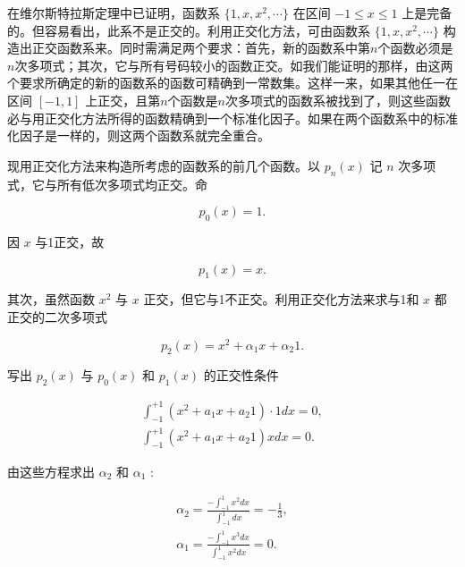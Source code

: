 在维尔斯特拉斯定理中已证明，函数系 $\{1,x,x^{2},\cdots\}$ 在区间 $-1\leqslant x\leqslant1$ 上是完备的。但容易看出，此系不是正交的。利用正交化方法，可由函数系 $\{1,x,x^{2},\cdots\}$ 构造出正交函数系来。同时需满足两个要求：首先，新的函数系中第$n$个函数必须是$n$次多项式；其次，它与所有号码较小的函数正交。如我们能证明的那样，由这两个要求所确定的新的函数系的函数可精确到一常数集。这样一来，如果其他任一在区间 $[-1,1]$ 上正交，且第$n$个函数是$n$次多项式的函数系被找到了，则这些函数必与用正交化方法所得的函数精确到一个标准化因子。如果在两个函数系中的标准化因子是一样的，则这两个函数系就完全重合。

现用正交化方法来构造所考虑的函数系的前几个函数。以 $p_n(x)$ 记 $n$ 次多项式，它与所有低次多项式均正交。命

\begin{equation*}
p _ {0} (x) = 1.
\end{equation*}

因 $x$ 与1正交，故

\begin{equation*}
p _ {1} (x) = x.
\end{equation*}

其次，虽然函数 $x^{2}$ 与 $x$ 正交，但它与1不正交。利用正交化方法来求与1和 $x$ 都正交的二次多项式

\begin{equation*}
p _ {2} (x) = x ^ {2} + \alpha_ {1} x + \alpha_ {2} 1.
\end{equation*}

写出 $p_2(x)$ 与 $p_0(x)$ 和 $p_1(x)$ 的正交性条件

\begin{equation*}
\begin{array}{l} \int_ {- 1} ^ {+ 1} (x ^ {2} + a _ {1} x + a _ {2} 1) \cdot 1 d x = 0, \\ \int_ {- 1} ^ {+ 1} (x ^ {2} + a _ {1} x + a _ {2} 1) x d x = 0. \end{array}
\end{equation*}

由这些方程求出 $\alpha_{2}$ 和 $\alpha_{1}$ :

\begin{equation*}
\begin{array}{l} \alpha_ {2} = \frac {- \int_ {- 1} ^ {1} x ^ {2} d x}{\int_ {- 1} ^ {1} d x} = - \frac {1}{3}, \\ \alpha_ {1} = \frac {- \int_ {- 1} ^ {1} x ^ {3} d x}{\int_ {- 1} ^ {1} x ^ {2} d x} = 0. \end{array}
\end{equation*}

